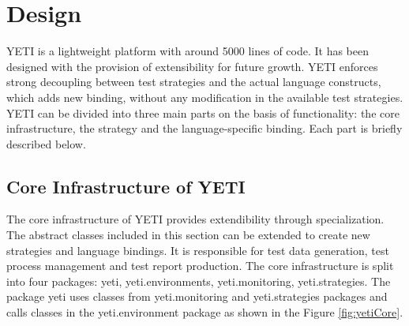 \section{Design}
YETI is a lightweight platform with around 5000 lines of code. It has been designed with the provision of extensibility for future growth. YETI enforces strong decoupling between test strategies and the actual language constructs, which adds new binding, without any modification in the available test strategies. YETI can be divided into three main parts on the basis of functionality: the core infrastructure, the strategy and the language-specific binding. Each part is briefly described below. 

\subsection{Core Infrastructure of YETI}
The core infrastructure of YETI provides extendibility through specialization. The abstract classes included in this section can be extended to create new strategies and language bindings. It is responsible for test data generation, test process management and test report production. The core infrastructure is split into four packages: yeti, yeti.environments, yeti.monitoring, yeti.strategies. The package yeti uses classes from yeti.monitoring and yeti.strategies packages and calls classes in the yeti.environment package as shown in the Figure \ref{fig:yetiCore}. 

